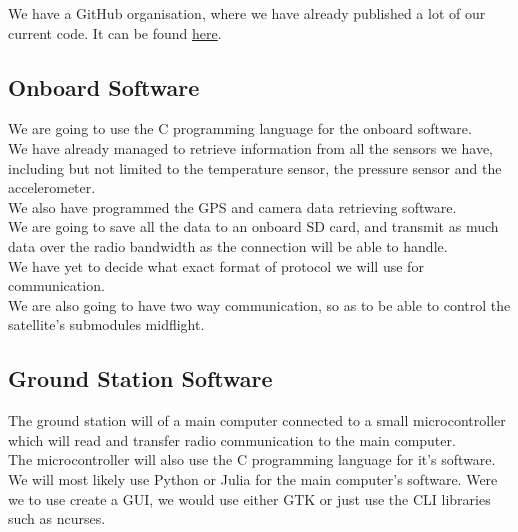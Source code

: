 \documentclass[class=report, crop=false]{standalone}
\begin{document}
\newpage
We have a GitHub organisation, where we have already published a lot of our current code. It can be found \href{https://github.com/CanOpeners}{here}. \\
\subsection*{Onboard Software}
We are going to use the C programming language for the onboard software. \\
We have already managed to retrieve information from all the sensors we have, including but not limited to the temperature sensor, the pressure sensor and the accelerometer. \\
We also have programmed the GPS and camera data retrieving software. \\
We are going to save all the data to an onboard SD card, and transmit as much data over the radio bandwidth as the connection will be able to handle. \\
We have yet to decide what exact format of protocol we will use for communication. \\
We are also going to have two way communication, so as to be able to control the satellite's submodules midflight.
\subsection*{Ground Station Software}
The ground station will of a main computer connected to a small microcontroller which will read and transfer radio communication to the main computer. \\
The microcontroller will also use the C programming language for it's software. \\
We will most likely use Python or Julia for the main computer's software. Were we to use create a GUI, we would use either GTK or just use the CLI libraries such as ncurses. \\
\end{document}
